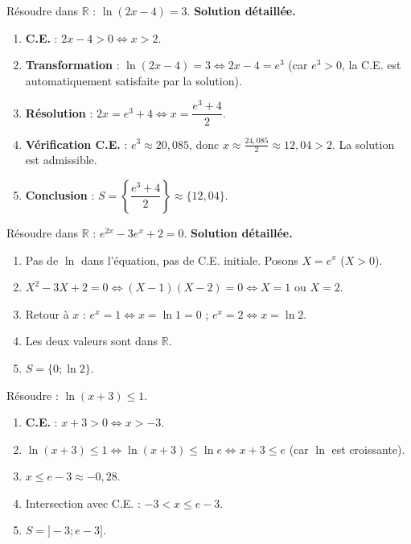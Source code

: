 \documentclass[11pt]{article}
\begin{document}
\begin{exoresolu}
Résoudre dans $\mathbb{R}$ : $\ln(2x - 4) = 3$.
\medskip
\noindent\textbf{Solution détaillée.}
\begin{enumerate}
    \item \textbf{C.E.} : $2x - 4 > 0 \iff x > 2$.
    \item \textbf{Transformation} : $\ln(2x - 4) = 3 \iff 2x - 4 = e^3$ (car $e^3 > 0$, la C.E. est automatiquement satisfaite par la solution).
    \item \textbf{Résolution} : $2x = e^3 + 4 \iff x = \dfrac{e^3 + 4}{2}$.
    \item \textbf{Vérification C.E.} : $e^3 \approx 20,085$, donc $x \approx \frac{24,085}{2} \approx 12,04 > 2$. La solution est admissible.
    \item \textbf{Conclusion} : $S = \left\{ \dfrac{e^3 + 4}{2} \right\} \approx \{12,04\}$.
\end{enumerate}
\end{exoresolu}

\begin{exoresolu}
Résoudre dans $\mathbb{R}$ : $e^{2x} - 3e^x + 2 = 0$.
\medskip
\noindent\textbf{Solution détaillée.}
\begin{enumerate}
    \item Pas de $\ln$ dans l'équation, pas de C.E. initiale. Posons $X = e^x$ ($X > 0$).
    \item $X^2 - 3X + 2 = 0 \iff (X-1)(X-2) = 0 \iff X = 1$ ou $X = 2$.
    \item Retour à $x$ : $e^x = 1 \iff x = \ln 1 = 0$ ; $e^x = 2 \iff x = \ln 2$.
    \item Les deux valeurs sont dans $\mathbb{R}$.
    \item $S = \{0 ; \ln 2\}$.
\end{enumerate}
\end{exoresolu}

\begin{exemplebox}
Résoudre : $\ln(x + 3) \le 1$.
\begin{enumerate}
    \item \textbf{C.E.} : $x + 3 > 0 \iff x > -3$.
    \item $\ln(x+3) \le 1 \iff \ln(x+3) \le \ln e \iff x+3 \le e$ (car $\ln$ est croissante).
    \item $x \le e - 3 \approx -0,28$.
    \item Intersection avec C.E. : $-3 < x \le e - 3$.
    \item $S = ]-3 ; e - 3]$.
\end{enumerate}
\end{exemplebox}
\end{document}
